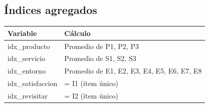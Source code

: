 \documentclass[
  spanish,
]{article}
\begin{document}
\subsection{Índices agregados}\label{uxedndices-agregados}

\begin{table}[!h]
\centering
\begin{tabular}{l>{\raggedright\arraybackslash}p{10cm}}
\toprule
Variable & Cálculo\\
\midrule
idx\_producto & Promedio de P1, P2, P3\\
idx\_servicio & Promedio de S1, S2, S3\\
idx\_entorno & Promedio de E1, E2, E3, E4, E5, E6, E7, E8\\
idx\_satisfaccion & = I1 (ítem único)\\
idx\_revisitar & = I2 (ítem único)\\
\bottomrule
\end{tabular}
\end{table}
\end{document}
